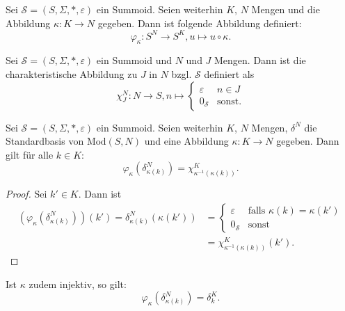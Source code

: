 \documentclass{article}
\begin{document}
\begin{definition}
  Sei $\mathcal{S} = (S, \Sigma, \ast, \varepsilon)$ ein Summoid.
  Seien weiterhin $K$, $N$ Mengen und die Abbildung $\kappa \colon K \to N$ gegeben.
  Dann ist folgende Abbildung definiert:
  \begin{equation*}
    \varphi_\kappa \colon S^N \to S^K, u \mapsto u \circ \kappa.
  \end{equation*}
\end{definition}

\begin{definition}
  Sei $\mathcal{S} = (S, \Sigma, \ast, \varepsilon)$ ein Summoid und $N$ und $J$ Mengen.
  Dann ist die charakteristische Abbildung zu $J$ in $N$ bzgl. $\mathcal{S}$ definiert als
  \begin{equation*}
    \chi^N_J \colon N \to S, n \mapsto
    \begin{cases}
      \varepsilon & n \in J \\
      0_\mathcal{S} & \text{sonst.}
    \end{cases}
  \end{equation*}
\end{definition}

\begin{theorem}
  Sei $\mathcal{S} = (S, \Sigma, \ast, \varepsilon)$ ein Summoid.
  Seien weiterhin $K$, $N$ Mengen, $\delta^N$ die Standardbasis von $\text{Mod}(S, N)$
  und eine Abbildung $\kappa \colon K \to N$ gegeben.
  Dann gilt für alle $k \in K$:
  \begin{equation*}
    \varphi_\kappa(\delta^N_{\kappa(k)})= \chi^K_{\kappa^{-1}(\kappa(k))}.
  \end{equation*}
\end{theorem}
\begin{proof}
  Sei $k' \in K$. Dann ist
  \begin{align*}
    (\varphi_\kappa(\delta^N_{\kappa(k)}))(k')
    = \delta^N_{\kappa(k)}(\kappa(k'))
    &= \begin{cases}
      \varepsilon & \text{falls } \kappa(k) = \kappa(k') \\
      0_\mathcal{S} & \text{sonst}
    \end{cases} \\
    &= \chi^K_{\kappa^{-1}(\kappa(k))}(k').
  \end{align*}
\end{proof}

\begin{corollary}
  Ist $\kappa$ zudem injektiv, so gilt:
  \begin{equation*}
    \varphi_\kappa(\delta^N_{\kappa(k)}) = \delta^K_k. 
  \end{equation*}
\end{corollary}
\end{document}

